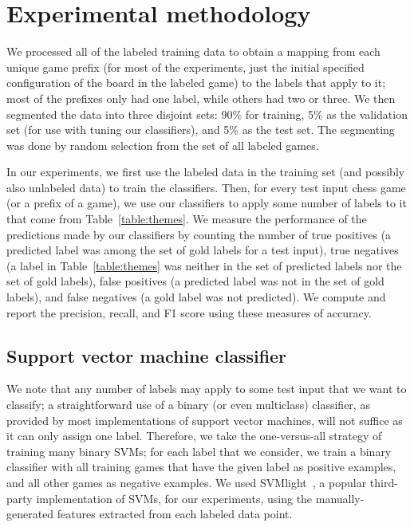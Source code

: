 \documentclass[11pt]{article}
\begin{document}
\section{Experimental methodology}
We processed all of the labeled training data to obtain a mapping from each unique game prefix (for most of the experiments, just the initial specified configuration of the board in the labeled game) to the labels that apply to it; most of the prefixes only had one label, while others had two or three. We then segmented the data into three disjoint sets: 90\% for training, 5\% as the validation set (for use with tuning our classifiers), and 5\% as the test set. The segmenting was done by random selection from the set of all labeled games.

In our experiments, we first use the labeled data in the training set (and possibly also unlabeled data) to train the classifiers. Then, for every test input chess game (or a prefix of a game), we use our classifiers to apply some number of labels to it that come from Table~\ref{table:themes}. We measure the performance of the predictions made by our classifiers by counting the number of true positives (a predicted label was among the set of gold labels for a test input), true negatives (a label in Table~\ref{table:themes} was neither in the set of predicted labels nor the set of gold labels), false positives (a predicted label was not in the set of gold labels), and false negatives (a gold label was not predicted). We compute and report the precision, recall, and F1 score using these measures of accuracy.

\subsection{Support vector machine classifier}
We note that any number of labels may apply to some test input that we want to classify; a straightforward use of a binary (or even multiclass) classifier, as provided by most implementations of support vector machines, will not suffice as it can only assign one label. Therefore, we take the one-versus-all strategy of training many binary SVMs; for each label that we consider, we train a binary classifier with all training games that have the given label as positive examples, and all other games as negative examples. We used SVMlight~\cite{svmlight}, a popular third-party implementation of SVMs, for our experiments, using the manually-generated features extracted from each labeled data point.
\end{document}
